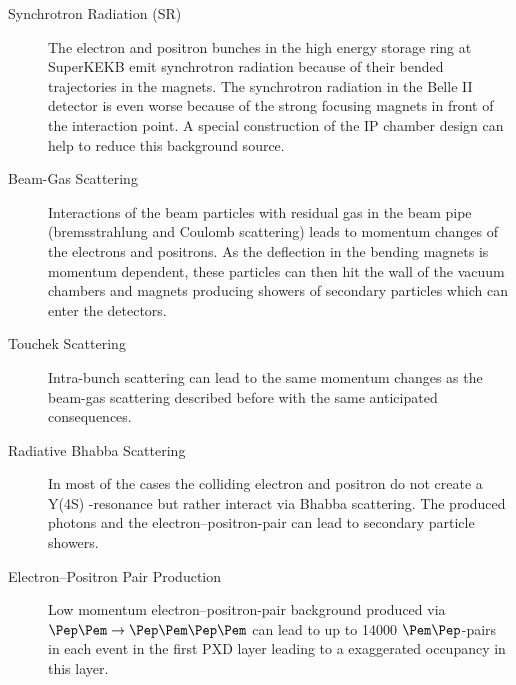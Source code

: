 \begin{description}
 \item[Synchrotron Radiation (SR)] The electron and positron bunches in the high energy storage ring at SuperKEKB emit synchrotron radiation because of their bended trajectories in the magnets. The synchrotron radiation in the Belle II detector is even worse because of the strong focusing magnets in front of the interaction point. A special construction of the IP chamber design can help to reduce this background source.
 \item[Beam-Gas Scattering] Interactions of the beam particles with residual gas in the beam pipe (bremsstrahlung and Coulomb scattering) leads to momentum changes of the electrons and positrons. As the deflection in the bending magnets is momentum dependent, these particles can then hit the wall of the vacuum chambers and magnets producing showers of secondary particles which can enter the detectors.
 \item[Touchek Scattering] Intra-bunch scattering can lead to the same momentum changes as the beam-gas scattering described before with the same anticipated consequences.
 \item[Radiative Bhabba Scattering] In most of the cases the colliding electron and positron do not create a Y(4S) -resonance but rather interact via Bhabba scattering. The produced photons and the electron--positron-pair can lead to secondary particle showers.
 \item[Electron--Positron Pair Production] Low momentum electron--positron-pair background produced via $\Pep \Pem \to \Pep \Pem \Pep \Pem$ can lead to up to 14000 $\Pem\Pep$-pairs in each event in the first PXD layer leading to a exaggerated occupancy in this layer.
\end{description}
